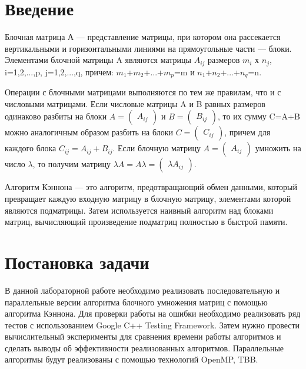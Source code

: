 \documentclass{report}
\begin{document}
\setcounter{page}{2}

\tableofcontents
\newpage

\section*{Введение}
\par 
Блочная матрица А — представление матрицы, при котором она рассекается вертикальными и горизонтальными линиями на прямоугольные части — блоки. Элементами блочной матрицы A являются матрицы $A_{ij}$ размеров $m_{i}$ х $n_{j}$,  i=1,2,...,p, j=1,2,...,q, причем: $m_{1}$+$m_{2}$+...+$m_{p}$=m и $n_{1}$+$n_{2}$+...+$n_{q}$=n.

Операции с блочными матрицами выполняются по тем же правилам, что и с числовыми матрицами. Если числовые матрицы A и B равных размеров одинаково разбиты на блоки $A=\begin{pmatrix}A_{ij}\end{pmatrix}$ и $B=\begin{pmatrix}B_{ij}\end{pmatrix}$, то их сумму C=A+B можно аналогичным образом разбить на блоки $C=\begin{pmatrix}C_{ij}\end{pmatrix}$, причем для каждого блока $C_{ij}=A_{ij}+B_{ij}$. Если блочную матрицу $A=\begin{pmatrix}A_{ij}\end{pmatrix}$ умножить на число $\lambda$, то получим матрицу $\lambda A=A\lambda=\begin{pmatrix}\lambda A_{ij}\end{pmatrix}$. 

Алгоритм Кэннона — это алгоритм, предотвращающий обмен данными, который превращает каждую входную матрицу в блочную матрицу, элементами которой являются подматрицы. Затем используется наивный алгоритм над блоками матриц, вычисляющий произведение подматриц полностью в быстрой памяти. 
\newpage

\section*{Постановка задачи}
\par В данной лабораторной работе необходимо реализовать последовательную и параллельные версии алгоритма блочного умножения матриц с помощью алгоритма Кэннона. Для проверки работы на ошибки необходимо реализовать ряд тестов с использованием Google C++ Testing Framework. Затем нужно провести
вычислительный эксперименты для сравнения времени работы алгоритмов и сделать выводы об эффективности реализованных алгоритмов. Параллельные алгоритмы будут реализованы с помощью технологий OpenMP, TBB.
\newpage
\end{document}
